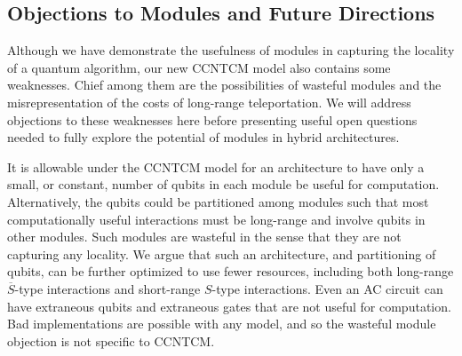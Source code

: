 

\subsection{Objections to Modules and Future Directions}
\label{subsec:module-future}

Although we have demonstrate the usefulness of modules in capturing
the locality of a quantum algorithm, our new \textsf{CCNTCM} model also
contains some weaknesses. Chief among them are the possibilities of
wasteful modules
and the misrepresentation of the costs of long-range teleportation. We will
address objections to these weaknesses here before presenting useful
open questions needed to fully explore the potential of modules in
hybrid architectures.

It is allowable under the \textsf{CCNTCM} model for an architecture
to have only a small,
or constant, number of qubits in each module be useful for computation.
Alternatively, the qubits could be partitioned among modules such that most
computationally useful interactions must be long-range and involve
qubits in other modules.
Such modules are wasteful in the sense that they are not capturing any
locality.
We argue that such an architecture, and partitioning of qubits, can be
further optimized to use fewer resources, including both long-range
$\overline{S}$-type interactions and short-range $S$-type interactions.
Even an \textsf{AC} circuit can have extraneous
qubits and extraneous gates that are not useful for computation.
Bad implementations are possible with any model, and so the wasteful module
objection is not specific to \textsf{CCNTCM}.

